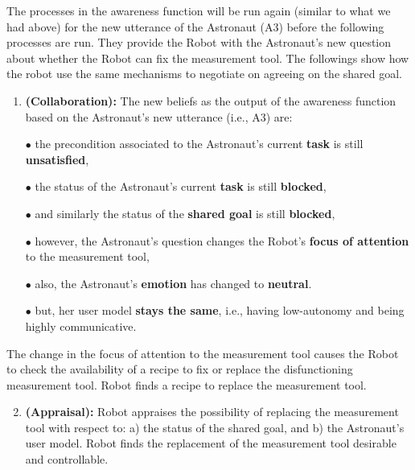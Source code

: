 The processes in the awareness function will be run again (similar to what we
had above) for the new utterance of the Astronaut (A3) before the following
processes are run. They provide the Robot with the Astronaut's new question
about whether the Robot can fix the measurement tool. The followings show how
the robot use the same mechanisms to negotiate on agreeing on the shared goal.

\begin{enumerate}
  \item \textbf{(Collaboration):} The new beliefs as the output of the awareness
  function based on the Astronaut's new utterance (i.e., A3) are:
\end{enumerate}

\begin{itemize}
  \item[$\bullet$] the precondition associated to the Astronaut's current
  \textbf{task} is still \textbf{unsatisfied},
  \item[$\bullet$] the status of the Astronaut's current \textbf{task} is still
  \textbf{blocked},
  \item[$\bullet$] and similarly the status of the \textbf{shared goal} is
  still \textbf{blocked},
  \item[$\bullet$] however, the Astronaut's question changes the Robot's
  \textbf{focus of attention} to the measurement tool,
  \item[$\bullet$] also, the Astronaut's \textbf{emotion} has changed to
  \textbf{neutral}.
  \item[$\bullet$] but, her user model \textbf{stays the same}, i.e.,
  having low-autonomy and being highly communicative.
\end{itemize}

The change in the focus of attention to the measurement tool causes the Robot to
check the availability of a recipe to fix or replace the disfunctioning
measurement tool. Robot finds a recipe to replace the measurement tool.\\

\begin{enumerate}
  \setcounter{enumi}{1}
  \item \textbf{(Appraisal):} Robot appraises the possibility of replacing the
  measurement tool with respect to: a) the status of the shared goal, and b) the
  Astronaut's user model. Robot finds the replacement of the measurement tool
  desirable and controllable.\\
\end{enumerate}

